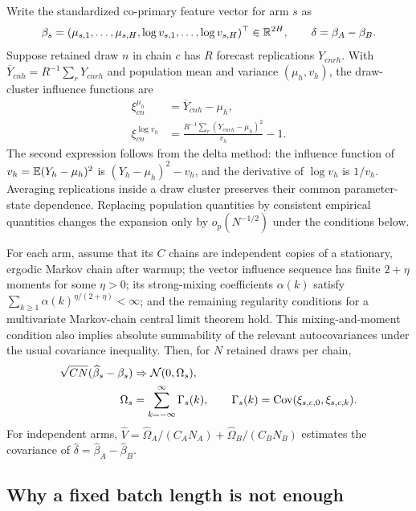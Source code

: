 Write the standardized co-primary feature vector for arm $s$ as
\begin{equation}
  \beta_s=
  (\mu_{s,1},\ldots,\mu_{s,H},
   \log v_{s,1},\ldots,\log v_{s,H})^\top\in\mathbb{R}^{2H},
  \qquad
  \delta=\beta_A-\beta_B.
  \label{eq:bf-ssl-lstm-primary-feature-vector}
\end{equation}
Suppose retained draw $n$ in chain $c$ has $R$ forecast replications
$Y_{cnrh}$.  With $\overline Y_{cn h}=R^{-1}\sum_rY_{cnrh}$ and population
mean and variance $(\mu_h,v_h)$, the draw-cluster influence functions are
\begin{align}
  \xi^{\mu_h}_{cn}
    &=\overline Y_{cn h}-\mu_h,                                             \\
  \xi^{\log v_h}_{cn}
    &=\frac{R^{-1}\sum_r(Y_{cnrh}-\mu_h)^2}{v_h}-1.
  \label{eq:bf-ssl-lstm-feature-influence}
\end{align}
The second expression follows from the delta method: the influence function
of $v_h=\mathbb{E}(Y_h-\mu_h)^2$ is $(Y_h-\mu_h)^2-v_h$, and the derivative of
$\log v_h$ is $1/v_h$.  Averaging replications inside a draw cluster preserves
their common parameter-state dependence.  Replacing population quantities by
consistent empirical quantities changes the expansion only by $o_p(N^{-1/2})$
under the conditions below.

For each arm, assume that its $C$ chains are independent copies of a stationary,
ergodic Markov chain after warmup; the vector influence sequence has finite
$2+\eta$ moments for some $\eta>0$; its strong-mixing coefficients
$\alpha(k)$ satisfy
$\sum_{k\geq1}\alpha(k)^{\eta/(2+\eta)}<\infty$; and the remaining regularity
conditions for a multivariate Markov-chain central limit theorem hold.  This
mixing-and-moment condition also implies absolute summability of the relevant
autocovariances under the usual covariance inequality.  Then, for $N$ retained
draws per chain,
\begin{align}
  \sqrt{CN}(\widehat\beta_s-\beta_s)
    &\Rightarrow\mathcal{N}(0,\Omega_s),                                         \\
  \Omega_s
    &=\sum_{k=-\infty}^{\infty}\Gamma_s(k),
  \qquad
  \Gamma_s(k)=\operatorname{Cov}(\xi_{s,c,0},\xi_{s,c,k}).
  \label{eq:bf-ssl-lstm-feature-clt}
\end{align}
For independent arms,
$\widehat V=\widehat\Omega_A/(C_A N_A)+
\widehat\Omega_B/(C_B N_B)$ estimates the covariance of
$\widehat\delta=\widehat\beta_A-\widehat\beta_B$.

\subsection{Why a fixed batch length is not enough}

